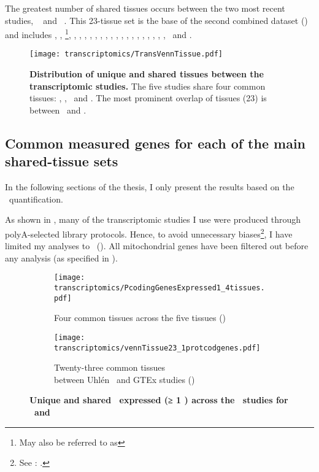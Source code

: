 The greatest number of shared tissues occurs
between the two most recent studies,
\uhlen~ and \gtex~.
This 23-tissue set is the base of the second combined dataset (\setTwo) and
includes
\Adipose, \Adrenal, \footnote{May also be referred to
as \Urinarybladder},
\Cortex, \hcolon, \Esophagus,
\Fallopian, \heart, \kidney, \liver, \lung, \Ovary, \Pancreas, \Prostate,
\salivary, \skeletal, \skin, \intestine, \spleen, \stomach, \testis,
\thyroid\ and \uterus.\mybr\

\begin{figure}[!htbp]
\texttt{[image: transcriptomics/TransVennTissue.pdf]}\centering
\caption[Distribution of unique and shared tissues between the
transcriptomic studies]
{\label{fig:VennStudiesT}\textbf{Distribution of unique and shared tissues
between the transcriptomic studies.} The five studies share four
common tissues: \heart, \kidney, \liver\ and \testis.
The most prominent overlap of tissues (23) is between \uhlen\ and \gtex.
}
\end{figure}

\subsection{Common measured genes for each of the main shared-tissue sets\quad}%
\label{subsec:transGeneOverlap}
\vspace*{-9mm}
In the following sections of the thesis,
I only present the results based on the \htseq\ quantification.

As shown in ,
many of the transcriptomic studies I use were produced through
polyA-selected library protocols.
Hence,
to avoid unnecessary biases\footnote{See
: .},
I have limited my analyses to \pcgs\ ().
All mitochondrial genes have been filtered out before any \treps{} analysis
(as specified in ).\mybr\

\begin{figure}[!hptb]
    \centering
    \begin{subfigure}[b]{\textwidth}
        \centering \texttt{[image: transcriptomics/PcodingGenesExpressed1\_4tissues.pdf]}
        \caption{Four common tissues across the five tissues (\setOne)}\label{fig:ExpGenePcoding1}
    \end{subfigure}

    \begin{subfigure}[b]{\textwidth}
        \centering \texttt{[image: transcriptomics/vennTissue23\_1protcodgenes.pdf]}
        \caption{Twenty-three common tissues\\ between Uhlén \etal\
        and GTEx studies (\setTwo)}\label{fig:ExpGenePcoding1_t23}
    \end{subfigure}
    \caption[Unique and shared \pcgs\ expressed (≥1 \FPKM) across RNA-Seq studies]%
    {\textbf{Unique and shared \pcgs\ expressed (≥ 1 \FPKM) across the \Rnaseq\ studies
    for \setOne\ and \setTwo}}
\end{figure}

